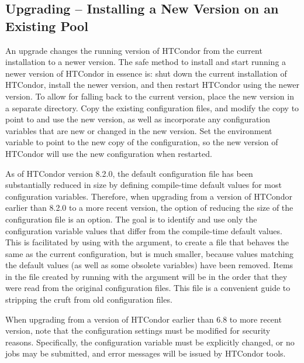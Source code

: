 \subsection{\label{sec:Pool-Upgrade}
Upgrading -- Installing a New Version on an Existing Pool}

An upgrade changes the running version of HTCondor
from the current installation to a newer version.
The safe method
to install and start running a newer version of HTCondor
in essence is:
shut down the current installation of HTCondor,
install the newer version,
and then restart HTCondor using the newer version.
To allow for falling back to the current version,
place the new version in a separate directory.
Copy the existing configuration files,
and modify the copy to point to and use the new version,
as well as incorporate any configuration variables that are new or changed
in the new version.
Set the  environment variable
to point to the new copy of the configuration,
so the new version of HTCondor will use the new configuration when restarted.

As of HTCondor version 8.2.0, 
the default configuration file has been substantially reduced
in size by defining compile-time default values for most configuration
variables.
Therefore,
when upgrading from a version of HTCondor earlier than 8.2.0 
to a more recent version,
the option of reducing the size of the configuration file is an option.
The goal is to identify and use only
the configuration variable values that differ from 
the compile-time default values.  
This is facilitated by using  with 
the  argument,
to create a file that behaves the same as the current configuration, 
but is much smaller,
because values matching the default values (as well as some obsolete variables)
have been removed.
Items in the file created by running
 with the  argument
will be in the order that they were read from the original configuration files.
This file is a convenient guide to stripping the cruft from 
old configuration files.

When upgrading from a version of HTCondor earlier than 6.8 to more recent version,
note that the configuration settings must be modified for security reasons.
Specifically, the  configuration variable
must be explicitly changed,
or no jobs may be submitted,
and error messages will be issued by HTCondor tools.

